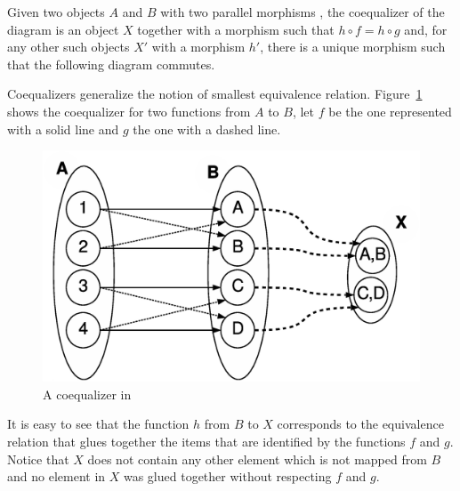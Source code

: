 \begin{definition}[Coequalizer] Given two objects $A$ and $B$ with two parallel morphisms  , the coequalizer of the diagram is an object $X$ together with a morphism  such that \mbox{$h \circ f = h \circ g$} and, for any other such objects $X'$ with a morphism $h'$, there is a unique morphism  such that the following diagram commutes.

\end{definition}

\begin{example} Coequalizers generalize the notion of smallest equivalence relation. Figure~\ref{fig:gts:coequalizer} shows the coequalizer for two functions from $A$ to $B$, let $f$ be the one represented with a solid line and $g$ the one with a dashed line.

\begin{figure}[!ht]
  \centering
  \includegraphics[scale=0.4]{images/gts/coequalizer}
  \caption{A coequalizer in }\label{fig:gts:coequalizer}
\end{figure}

  It is easy to see that the function $h$ from $B$ to $X$ corresponds to the equivalence relation that glues together the items that are identified by the functions $f$ and $g$. Notice that $X$ does not contain any other element which is not mapped from $B$ and no element in $X$ was glued together without respecting $f$ and $g$.

\end{example}

